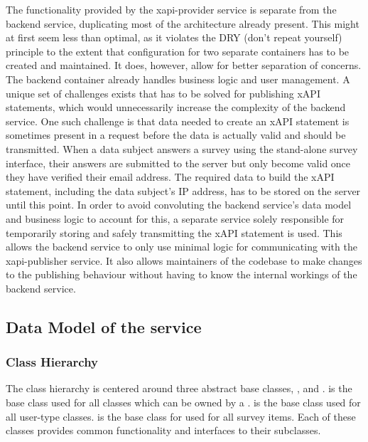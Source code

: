         The functionality provided by the xapi-provider service
        is separate from the backend service, duplicating
        most of the architecture already present. This might at first seem
        less than optimal, as it violates the DRY (don't repeat yourself)
        principle to the extent that configuration for two separate containers
        has to be created and maintained. It does, however, allow for better
        separation of concerns. The backend container already
        handles business logic and user management. A unique
        set of challenges exists that has to be solved for publishing xAPI
        statements, which would unnecessarily increase the complexity
        of the backend service. One such challenge is that
        data needed to create an xAPI statement is sometimes present in a request
        before the data is actually valid and should be transmitted. 
        When a data subject answers a survey using the stand-alone survey
        interface, their answers are submitted to the server but only
        become valid once they have verified their email address.
        The required data to build the xAPI statement, including the data
        subject's IP address, has to be stored on the server until this
        point. In order to avoid convoluting the backend service's
        data model and business logic to account for this, a separate
        service solely responsible for temporarily storing and safely 
        transmitting the xAPI statement is used.
        This allows the backend service to only use minimal logic
        for communicating with the xapi-publisher service.
        It also allows maintainers of the codebase to make changes
        to the publishing behaviour without having to know the internal
        workings of the backend service.

\subsection{Data Model of the  service}
    \subsubsection{Class Hierarchy}
        The class hierarchy is centered around three abstract base classes,
        ,  and .
         is the base class used for all classes
        which can be owned by a .  is
        the base class used for all user-type classes. 
        is the base class for used for all survey items.
        Each of these classes provides common functionality and
        interfaces to their subclasses.

